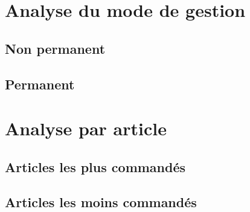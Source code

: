 \documentclass{beamer}
\begin{document}
    \section{Analyse du mode de gestion}
    \subsection{Non permanent}

    \begin{frame}
    \end{frame}

    \subsection{Permanent}

    \begin{frame}
    \end{frame}

    \section{Analyse par article}
    \subsection{Articles les plus commandés}

    \begin{frame}
    \end{frame}

    \subsection{Articles les moins commandés}

    \begin{frame}
    \end{frame}
\end{document}
